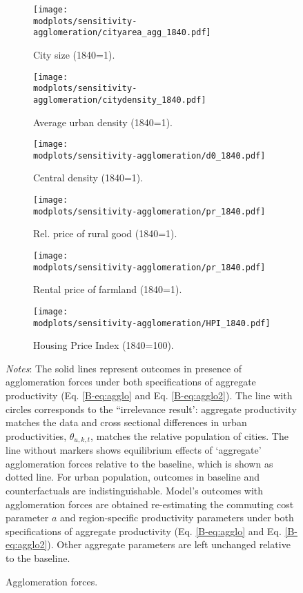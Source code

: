 \documentclass[11pt]{report}
\newcommand{\round}{revision3}  %
\newcommand{\modplots}{../../output/model/plots/\round}
\newcommand{\pthree}{0.37}  %
\newcommand{\parboxadjust}{1.1}
\begin{document}
\begin{figure}
	\begin{adjustbox}{center}
		\parbox{\parboxadjust\textwidth}{\lineskip=0pt
			
			\begin{subfigure}{\pthree\textwidth}
				\texttt{[image: \\modplots/sensitivity-agglomeration/cityarea\_agg\_1840.pdf]}
				\caption{City size (1840=1).\label{B-fig:model-sensi-agglo-area}}
			\end{subfigure}%
			\begin{subfigure}{\pthree\textwidth}
				\texttt{[image: \\modplots/sensitivity-agglomeration/citydensity\_1840.pdf]}
				\caption{Average urban density (1840=1).\label{B-fig:model-sensi-agglo-avgd}}
			\end{subfigure}%
			\begin{subfigure}{\pthree\textwidth}
				\texttt{[image: \\modplots/sensitivity-agglomeration/d0\_1840.pdf]}
				\caption{Central density (1840=1).\label{B-fig:model-sensi-agglo-d0}}
			\end{subfigure}
			
			\begin{subfigure}{\pthree\textwidth}
				\texttt{[image: \\modplots/sensitivity-agglomeration/pr\_1840.pdf]}
				\caption{Rel. price of rural good (1840=1).\label{B-fig:model-sensi-agglo-pr}}
			\end{subfigure}%
			\begin{subfigure}{\pthree\textwidth}
				\texttt{[image: \\modplots/sensitivity-agglomeration/ρr\_1840.pdf]}
				\caption{Rental price of farmland (1840=1).\label{B-fig:model-sensi-agglo-rhor}}
			\end{subfigure}%
			\begin{subfigure}{\pthree\textwidth}
				\texttt{[image: \\modplots/sensitivity-agglomeration/HPI\_1840.pdf]}
				\caption{Housing Price Index (1840=100).\label{B-fig:model-sensi-agglo-hpi}}
			\end{subfigure}
		}
	\end{adjustbox}
	\caption{Agglomeration forces.\label{B-fig:model-sensi-agglo}}
	{\footnotesize \textit{Notes}: The solid lines represent outcomes in presence of agglomeration forces under both specifications of aggregate productivity (Eq. \ref{B-eq:agglo} and Eq. \ref{B-eq:agglo2}). The line with circles corresponds to the ``irrelevance result':  aggregate productivity matches the data and cross sectional differences in urban productivities, $\theta_{u,k,t}$, matches the relative population of cities.  The line without markers shows equilibrium effects of `aggregate' agglomeration forces relative to the baseline, which is shown as dotted line. For urban population, outcomes in baseline and counterfactuals are indistinguishable. Model's outcomes with agglomeration forces are obtained re-estimating the commuting cost parameter $a$ and region-specific productivity parameters under both specifications of aggregate productivity (Eq. \ref{B-eq:agglo} and Eq. \ref{B-eq:agglo2}). Other aggregate parameters are left unchanged relative to the baseline.}
\end{figure}
\end{document}
